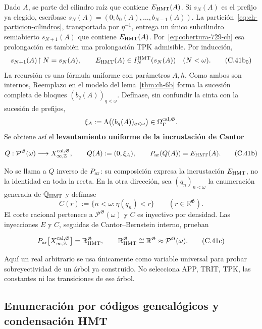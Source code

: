 Dado \(A\), se parte del cilindro raíz que contiene \(E_{\rm HMT}(A)\). Si
\(s_N(A)\) es el prefijo ya elegido, escríbase
\(s_N(A)=(0;b_0(A),\ldots,b_{N-1}(A))\). La partición~\eqref{eq:ch-particion-cilindros}, transportada
por \(\eta^{-1}\), entrega un único subcilindro semiabierto
\(s_{N+1}(A)\) que contiene \(E_{\rm HMT}(A)\). Por~\eqref{eq:cobertura-729-ch} esa prolongación es
también una prolongación TPK admisible. Por inducción,
\[
 s_{N+1}(A)\!\upharpoonright N=s_N(A),\qquad
 E_{\rm HMT}(A)\in I_N^{\rm HMT}(s_N(A))\quad(N<\omega).
\tag{C.41b$_0$}\label{eq:ch-prefijos-uniformes}
\]
La recursión es una fórmula uniforme con parámetros \(A,h\). Como ambos son
internos, Reemplazo en el modelo del lema~\ref{thm:ch-6b} forma la sucesión completa de
bloques \((b_q(A))_{q<\omega}\). Defínase, sin confundir la cinta con la
sucesión de prefijos,
\[
 \xi_A:=\Lambda\bigl((b_q(A))_{q<\omega}\bigr)
 \in\Omega_\Gamma^{\rm cal,\mathfrak G}.
\]
Se obtiene así el \textbf{levantamiento uniforme de la incrustación de Cantor}

\[
 Q:\mathcal P^{\mathfrak G}(\omega)
 \longrightarrow X_{\infty,\mathbb Z}^{\rm cal,\mathfrak G},
 \qquad
 Q(A):=(0,\xi_A),\qquad
 P_{\rm ar}(Q(A))=E_{\rm HMT}(A).
\tag{C.41b}\label{eq:ch-levantamiento-uniforme}
\]

No se llama a \(Q\) inverso de \(P_{\rm ar}\): su composición expresa la
incrustación \(E_{\rm HMT}\), no la identidad en toda la recta. En la otra
dirección, sea \((q_n)_{n<\omega}\) la enumeración generada de
\(\mathbb Q_{\rm HMT}\) y defínase
\[
 C(r):=\{n<\omega:\eta(q_n)<r\}
 \qquad(r\in\mathbb R^{\mathfrak G}).
\]
El corte racional pertenece a \(\mathcal P^{\mathfrak G}(\omega)\) y
\(C\) es inyectivo por densidad. Las inyecciones \(E\) y \(C\), seguidas de
Cantor--Bernstein interno, prueban

\[
 P_{\rm ar}
 \bigl[X_{\infty,\mathbb Z}^{\rm cal,\mathfrak G}\bigr]
 =\mathbb R_{\rm HMT}^{\mathfrak G},
 \qquad
 \mathbb R_{\rm HMT}^{\mathfrak G}
 \cong\mathbb R^{\mathfrak G}
 \approx\mathcal P^{\mathfrak G}(\omega).
\tag{C.41c}\label{eq:ch-recta-potencia}
\]

Aquí un real arbitrario se usa únicamente como variable universal para probar
sobreyectividad de un árbol ya construido. No selecciona APP, TRIT, TPK, las
constantes ni las transiciones de ese árbol.

\subsection{Enumeración por códigos genealógicos y condensación HMT}

